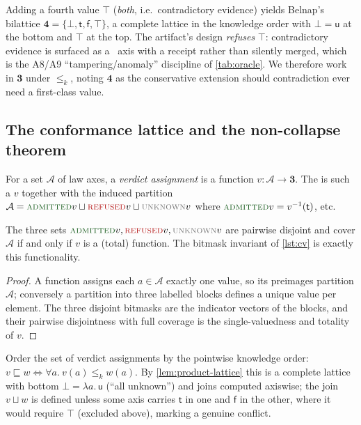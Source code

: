 \begin{remark}
Adding a fourth value $\top$ (\emph{both}, i.e.\ contradictory evidence) yields
Belnap's bilattice $\mathbf 4=\{\bot,\mathsf t,\mathsf f,\top\}$, a complete
lattice in the knowledge order with $\bot=\mathsf u$ at the bottom and $\top$ at
the top. The artifact's design \emph{refuses} $\top$: contradictory evidence is
surfaced as a \ axis with a receipt rather than silently merged, which is
the A8/A9 ``tampering/anomaly'' discipline of \cref{tab:oracle}. We therefore
work in $\mathbf 3$ under $\le_k$, noting $\mathbf 4$ as the conservative
extension should contradiction ever need a first-class value.
\end{remark}

\subsection{The conformance lattice and the non-collapse theorem}
\label{sec:order-conformance}

\begin{definition}
\label{def:verdict}
For a set $\mathcal A$ of law axes, a \emph{verdict assignment} is a function
$v\colon\mathcal A\to\mathbf 3$. The  is such a $v$
together with the induced partition
$\mathcal A=\admitted v\sqcup\refused v\sqcup\unknownstat v$ where
$\admitted v=v^{-1}(\mathsf t)$, etc.
\end{definition}

\begin{proposition}
\label{prop:disjoint}
The three sets $\admitted v,\refused v,\unknownstat v$ are pairwise disjoint and
cover $\mathcal A$ if and only if $v$ is a (total) function. The bitmask
invariant of \cref{lst:cv} is exactly this functionality.
\end{proposition}
\begin{proof}
A function assigns each $a\in\mathcal A$ exactly one value, so its preimages
partition $\mathcal A$; conversely a partition into three labelled blocks defines
a unique value per element. The three disjoint bitmasks are the indicator vectors
of the blocks, and their pairwise disjointness with full coverage is the
single-valuedness and totality of $v$.
\end{proof}

Order the set of verdict assignments by the pointwise knowledge order:
$v\sqsubseteq w \iff \forall a.\ v(a)\le_k w(a)$. By
\cref{lem:product-lattice} this is a complete lattice with bottom
$\bot=\lambda a.\,\mathsf u$ (``all unknown'') and joins computed axiswise; the
join $v\sqcup w$ is defined unless some axis carries $\mathsf t$ in one and
$\mathsf f$ in the other, where it would require $\top$ (excluded above), marking
a genuine conflict.

